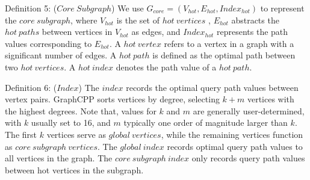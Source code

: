\documentclass[lettersize,journal]{IEEEtran} %
\begin{document}
Definition 5: ($Core~Subgraph$) We use $G_{core}=(V_{hot},E_{hot},Index_{hot})$ to represent the $core~subgraph$, where $V_{hot}$ is the set of $hot~vertices$ , $E_{hot}$ abstracts the $hot~paths$ between vertices in $V_{hot}$ as edges, and $Index_{hot}$ represents the path values corresponding to $E_{hot}$. A $hot~vertex$ refers to a vertex in a graph with a significant number of edges. A $hot~path$ is defined as the optimal path between two $hot~vertices$. A $hot~index$ denotes the path value of a $hot~path$.

Definition 6: ($Index$) The $index$ records the optimal query path values between vertex pairs. GraphCPP sorts vertices by degree, selecting $k+m$ vertices with the highest degrees. Note that, values for $k$ and $m$ are generally user-determined, with $k$ usually set to 16, and $m$ typically one order of magnitude larger than $k$. The first $k$ vertices serve as $global~vertices$, while the remaining vertices function as $core~subgraph~vertices$. The $global~index$ records optimal query path values to all vertices in the graph. The $core~subgraph~index$ only records query path values between hot vertices in the subgraph.
\end{document}
